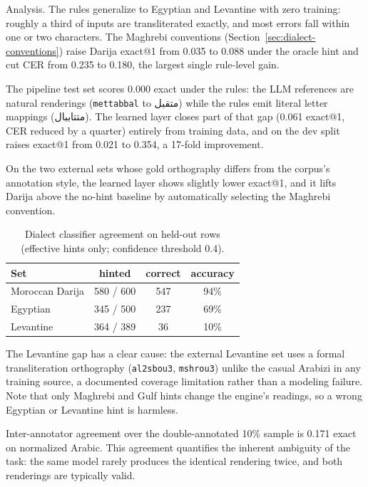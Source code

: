 \documentclass[11pt]{article}
\newcommand{\ar}[1]{{\arabicfont #1}}
\newcommand{\az}[1]{\texttt{#1}}
\begin{document}
Analysis. The rules generalize to Egyptian and Levantine with zero
training: roughly a third of inputs are transliterated exactly, and most
errors fall within one or two characters. The Maghrebi conventions
(Section~\ref{sec:dialect-conventions}) raise Darija exact@1 from 0.035
to 0.088 under the oracle hint and cut CER from 0.235 to 0.180, the
largest single rule-level gain.

The pipeline test set scores 0.000 exact under the rules: the LLM
references are natural renderings (\az{mettabbal} to \ar{متقبل}) while
the rules emit literal letter mappings (\ar{متتاببال}). The learned
layer closes part of that gap (0.061 exact@1, CER reduced by a quarter)
entirely from training data, and on the dev split raises exact@1 from
0.021 to 0.354, a 17-fold improvement.

On the two external sets whose gold orthography differs from the
corpus's annotation style, the learned layer shows slightly lower
exact@1, and it lifts Darija above the no-hint baseline by automatically
selecting the Maghrebi convention.

\begin{table}[t]
\centering
\small
\caption{Dialect classifier agreement on held-out rows (effective hints
only; confidence threshold 0.4).}
\label{tab:classifier}
\begin{tabular}{lccc}
\toprule
Set & hinted & correct & accuracy \\
\midrule
Moroccan Darija & 580 / 600 & 547 & 94\% \\
Egyptian        & 345 / 500 & 237 & 69\% \\
Levantine       & 364 / 389 & 36  & 10\% \\
\bottomrule
\end{tabular}
\end{table}

The Levantine gap has a clear cause: the external Levantine set uses a
formal transliteration orthography (\az{al2sbou3}, \az{mshrou3}) unlike
the casual Arabizi in any training source, a documented coverage
limitation rather than a modeling failure. Note that only Maghrebi and
Gulf hints change the engine's readings, so a wrong Egyptian or Levantine
hint is harmless.

Inter-annotator agreement over the double-annotated 10\% sample is 0.171
exact on normalized Arabic. This agreement quantifies the inherent
ambiguity of the task: the same model rarely produces the identical
rendering twice, and both renderings are typically valid.
\end{document}
